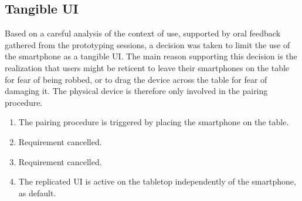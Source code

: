 \subsection{Tangible UI}

Based on a careful analysis of the context of use, supported by oral feedback gathered from the prototyping sessions, a decision was taken to limit the use of the smartphone as a tangible UI.
The main reason supporting this decision is the realization that users might be reticent to leave their smartphones on the table for fear of being robbed, or to drag the device across the table for fear of damaging it.
The physical device is therefore only involved in the pairing procedure.

\begin{enumerate}[{DD}-1]
\item The pairing procedure is triggered by placing the smartphone on the table.
\item Requirement cancelled.
\item Requirement cancelled.
\item The replicated UI is active on the tabletop independently of the smartphone, as default.
\end{enumerate}


